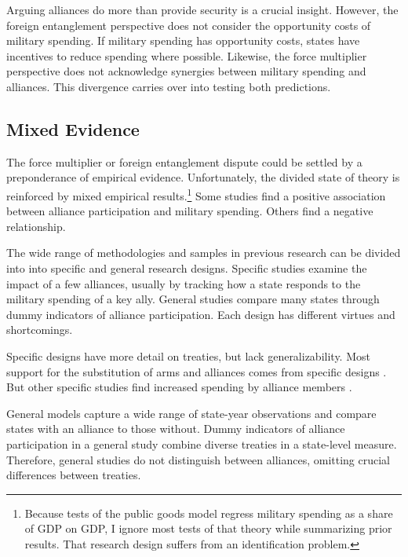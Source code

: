 \documentclass[12pt]{article}
\begin{document}
Arguing alliances do more than provide security is a crucial insight.
However, the foreign entanglement perspective does not consider the opportunity costs of military spending. 
If military spending has opportunity costs, states have incentives to reduce spending where possible.  
Likewise, the force multiplier perspective does not acknowledge synergies between military spending and alliances. 
This divergence carries over into testing both predictions. 


\subsection{Mixed Evidence} 


The force multiplier or foreign entanglement dispute could be settled by a preponderance of empirical evidence. 
Unfortunately, the divided state of theory is reinforced by mixed empirical results.\footnote{Because tests of the public goods model regress military spending as a share of GDP on GDP, I ignore most tests of that theory while summarizing prior results. That research design suffers from an identification problem.}
Some studies find a positive association between alliance participation and military spending. 
Others find a negative relationship. 


The wide range of methodologies and samples in previous research can be divided into into specific and general research designs.  
Specific studies examine the impact of a few alliances, usually by tracking how a state responds to the military spending of a key ally. 
General studies compare many states through dummy indicators of alliance participation. 
Each design has different virtues and shortcomings. 


Specific designs have more detail on treaties, but lack generalizability. 
Most support for the substitution of arms and alliances comes from specific designs \citep{BarnettLevy1991, Morrow1993, Sorokin1994, PluemperNeumayer2015}. 
But other specific studies find increased spending by alliance members \citep{ConybeareSandler1990, Chenetal1996}. 



General models capture a wide range of state-year observations and compare states with an alliance to those without.
Dummy indicators of alliance participation in a general study combine diverse treaties in a state-level measure. 
Therefore, general studies do not distinguish between alliances, omitting crucial differences between treaties.  
\end{document}

